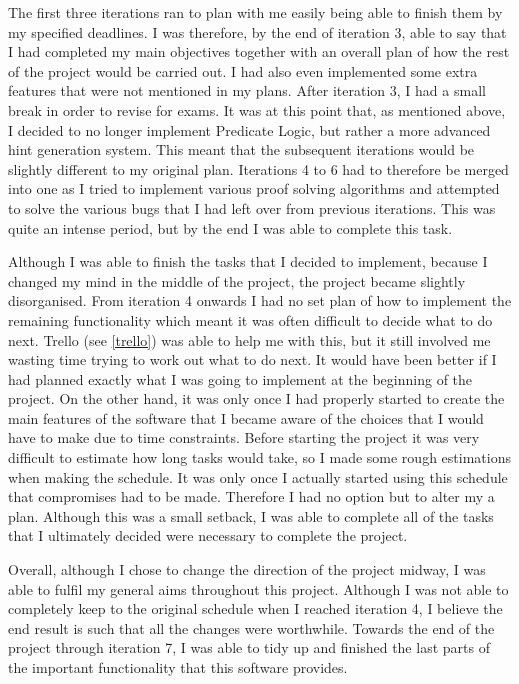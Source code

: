 The first three iterations ran to plan with me easily being able to finish them by my specified deadlines. I was therefore, by the end of iteration 3, able to say that I had completed my main objectives together with an overall plan of how the rest of the project would be carried out. I had also even implemented some extra features that were not mentioned in my plans. After iteration 3, I had a small break in order to revise for exams. It was at this point that, as mentioned above, I decided to no longer implement Predicate Logic, but rather a more advanced hint generation system. This meant that the subsequent iterations would be slightly different to my original plan. Iterations 4 to 6 had to therefore be merged into one as I tried to implement various proof solving algorithms and attempted to solve the various bugs that I had left over from previous iterations. This was quite an intense period, but by the end I was able to complete this task. 

Although I was able to finish the tasks that I decided to implement, because I changed my mind in the middle of the project, the project became slightly disorganised. From iteration 4 onwards I had no set plan of how to implement the remaining functionality which meant it was often difficult to decide what to do next. Trello (see \ref{trello}) was able to help me with this, but it still involved me wasting time trying to work out what to do next. It would have been better if I had planned exactly what I was going to implement at the beginning of the project. On the other hand, it was only once I had properly started to create the main features of the software that I became aware of the choices that I would have to make due to time constraints. Before starting the project it was very difficult to estimate how long tasks would take, so I made some rough estimations when making the schedule. It was only once I actually started using this schedule that compromises had to be made. Therefore I had no option but to alter my a plan. Although this was a small setback, I was able to complete all of the tasks that I ultimately decided were necessary to complete the project.

Overall, although I chose to change the direction of the project midway, I was able to fulfil my general aims throughout this project. Although I was not able to completely keep to the original schedule when I reached iteration 4, I believe the end result is such that all the changes were worthwhile. Towards the end of the project through iteration 7, I was able to tidy up and finished the last parts of the important functionality that this software provides.

